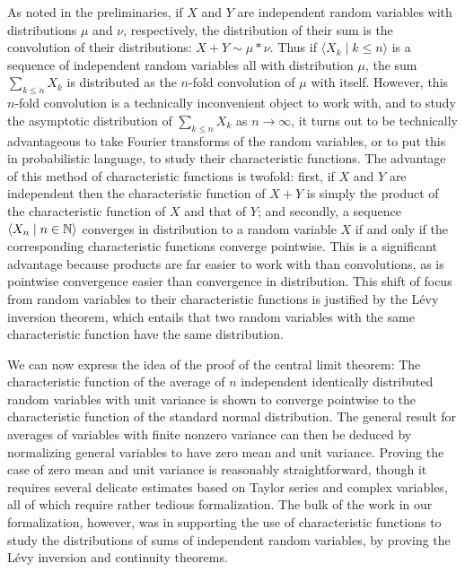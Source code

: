 \documentclass[leqno]{article}
\theoremstyle{definition}
\newcommand{\bldseq}[2]{\langle{#1}\mid{#2}\rangle}
\begin{document}
As noted in the preliminaries, if $X$ and $Y$ are independent random variables with distributions $\mu$ and $\nu$, respectively, the distribution of their sum is the convolution of their distributions: $X + Y \sim \mu * \nu$. Thus if $\bldseq{X_k}{k \le n}$ is a sequence of independent random variables all with distribution $\mu$, the sum $\sum_{k \le n} X_k$ is distributed as the $n$-fold convolution of $\mu$ with itself. However, this $n$-fold convolution is a technically inconvenient object to work with, and to study the asymptotic distribution of $\sum_{k \le n} X_k$ as $n \rightarrow \infty$, it turns out to be technically advantageous to take Fourier transforms of the random variables, or to put this in probabilistic language, to study their characteristic functions. The advantage of this method of characteristic functions is twofold: first, if $X$ and $Y$ are independent then the characteristic function of $X + Y$ is simply the product of the characteristic function of $X$ and that of $Y$; and secondly, a sequence $\bldseq{X_n}{n \in \N}$ converges in distribution to a random variable $X$ if and only if the corresponding characteristic functions converge pointwise. This is a significant advantage because products are far easier to work with than convolutions, as is pointwise convergence easier than convergence in distribution. This shift of focus from random variables to their characteristic functions is justified by the L\'evy inversion theorem, which entails that two random variables with the same characteristic function have the same distribution.

We can now express the idea of the proof of the central limit theorem: The characteristic function of the average of $n$ independent identically distributed random variables with unit variance is shown to converge pointwise to the characteristic function of the standard normal distribution. The general result for averages of variables with finite nonzero variance can then be deduced by normalizing general variables to have zero mean and unit variance. Proving the case of zero mean and unit variance is reasonably straightforward, though it requires several delicate estimates based on Taylor series and complex variables, all of which require rather tedious formalization. The bulk of the work in our formalization, however, was in supporting the use of characteristic functions to study the distributions of sums of independent random variables, by proving the L\'evy inversion and continuity theorems.
\end{document}
